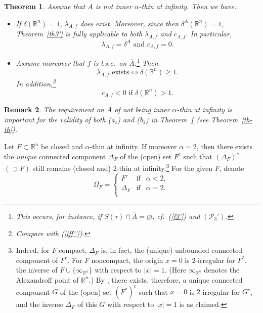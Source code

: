 \documentclass[12pt,a4paper,reqno]{amsart} %
\theoremstyle{lause}
\theoremstyle{maaritelma}
\theoremstyle{lause}
\newtheorem{theorem}{Theorem}[section]
\theoremstyle{maaritelma}
\newtheorem{remark}[theorem]{Remark}
\numberwithin{equation}{section}
\begin{document}
\begin{theorem}\label{th-nonth}
 Assume that $A$ is not inner $\alpha$-thin at infinity. Then we have:
 \begin{itemize}
\item[{\rm(a$_1$)}] If $\delta(\mathbb R^n)=1$, $\lambda_{A,f}$ does exist. Moreover, since then $\delta^A(\mathbb R^n)=1$,  Theorem~{\rm\ref{th3'}} is fully applicable to both $\lambda_{A,f}$ and $c_{A,f}$. In particular,
    \begin{equation}\label{iff''}\lambda_{A,f}=\delta^A\text{ \ and \ }c_{A,f}=0.\end{equation}
\item[{\rm(b$_1$)}] Assume moreover that $f$ is l.s.c.\ on $\overline{A}$.\footnote{This occurs, for instance, if $S(\tau)\cap\overline{A}=\varnothing$, cf.\ (\ref{f3'}) and $(\mathcal P_3')$.} Then
 \begin{equation}\label{iff}
 \text{$\lambda_{A,f}$ exists}\iff\delta(\mathbb R^n)\geqslant1.
 \end{equation}
 In addition,\footnote{Compare with (\ref{iff''}).}
 \begin{equation}\label{F1}
   c_{A,f}<0\text{ \ if \  $\delta(\mathbb R^n)>1$}.
 \end{equation}
 \end{itemize}
\end{theorem}

\begin{remark}The requirement on $A$ of not being inner $\alpha$-thin at infinity is important for the validity of both (a$_1$) and (b$_1$) in Theorem~\ref{th-nonth} (see Theorem~\ref{th-th}).\end{remark}

Let $F\subset\mathbb R^n$ be closed and $\alpha$-thin at infinity. If moreover $\alpha=2$, then there exists the {\it unique} connected component $\Delta_F$ of the (open) set $F^c$ such that $(\Delta_F)^c$ $({}\supset F)$ still remains (closed and) $2$-thin at infinity.\footnote{Indeed, for $F$ compact, $\Delta_F$ is, in fact, the (unique) unbounded connected component of $F^c$. For $F$ noncompact, the origin $x=0$ is $2$-irregular for $F^*$, the inverse of $F\cup\{\infty_{\mathbb R^n}\}$ with respect to $|x|=1$. (Here $\infty_{\mathbb R^n}$ denotes the Alexandroff point of $\mathbb R^n$.) By \cite[Section~VIII.6, Remark~3]{Brelo1}, there exists, therefore, a unique connected component $G$ of the (open) set $(F^*)^c$ such that $x=0$ is $2$-ir\-reg\-ular for $G^c$, and the inverse $\Delta_F$ of this $G$ with respect to $|x|=1$ is as claimed.} For the given $F$, denote
\begin{equation}\label{Om}
\Omega_F=\left\{
\begin{array}{cll} F^c&\text{if}&\alpha<2,\\
\Delta_F&\text{if}&\alpha=2.\\ \end{array} \right.
\end{equation}
\end{document}
